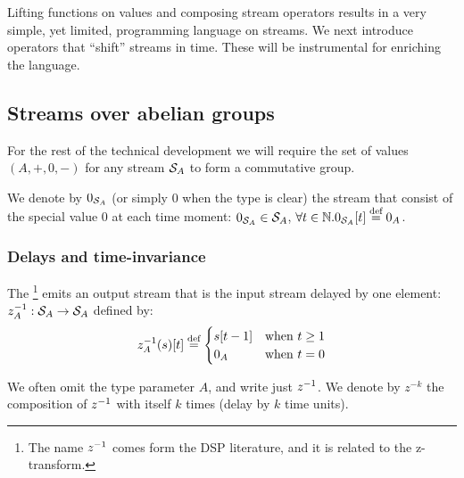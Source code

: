 

Lifting functions on values and composing stream operators results in a very simple, yet limited, programming language on streams.  
We next introduce operators that ``shift'' streams in time.
These will be instrumental for enriching the language.

\subsection{Streams over abelian groups}\label{sec:abelian}

For the rest of the technical development we will require the set of values $(A, +, 0, -)$
for any stream $\mathcal{S}_{A}$ to form a commutative group.  

We denote by $0_{\mathcal{S}_{A}}$ (or simply $0$ when the type is clear) the stream that consist of the special 
value 0 at each time moment: $0_{\mathcal{S}_{A}} \in \mathcal{S}_{A}$, $\forall t \in \mathbb{N} . 0_{\mathcal{S}_{A}}[t] \stackrel{\textrm{\scriptsize def}}{=} 0_A$.

\subsubsection{Delays and time-invariance}\label{sec:delay}

\begin{definition}[Delay]
The \footnote{The name $z^{-1}$
comes form the DSP literature, and it is related to the z-transform.} emits an output stream that is 
the input stream delayed by one element: $z^{-1}_A: \mathcal{S}_{A} \to \mathcal{S}_{A}$ defined by:
$$
z^{-1}_A(s)[t] \stackrel{\textrm{\scriptsize def}}{=}  \begin{cases}
s[t - 1] & \text{when}~t\geq1\\
0_A      & \text{when}~t=0
\end{cases}
$$

We often omit the type parameter $A$, and write just $z^{-1}$.
We denote by $z^{-k}$ the composition of $z^{-1}$
with itself $k$ times (delay by $k$ time units). 
\end{definition}

\begin{center}
\end{center}

